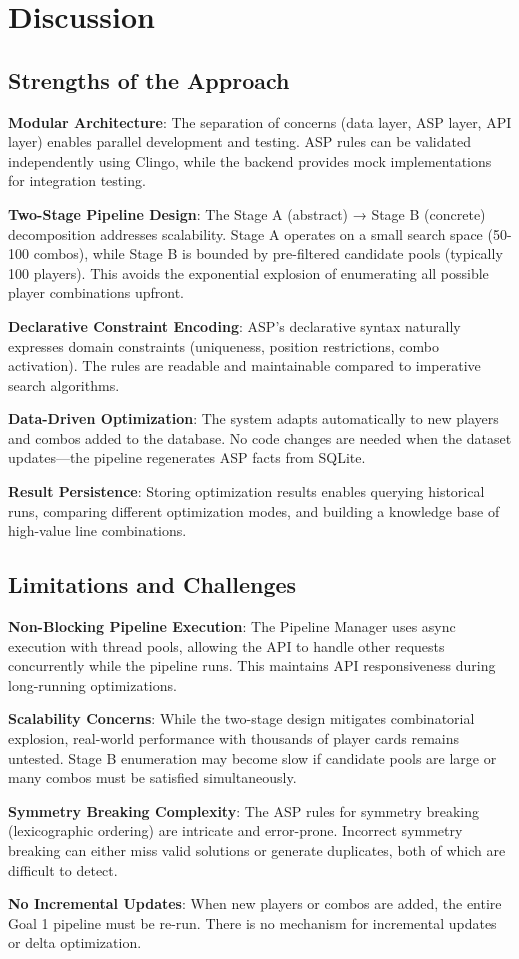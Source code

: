 \section{Discussion}

\subsection{Strengths of the Approach}

\textbf{Modular Architecture}: The separation of concerns (data layer, ASP layer, API layer) enables parallel development and testing. ASP rules can be validated independently using Clingo, while the backend provides mock implementations for integration testing.

\textbf{Two-Stage Pipeline Design}: The Stage A (abstract) → Stage B (concrete) decomposition addresses scalability. Stage A operates on a small search space (50-100 combos), while Stage B is bounded by pre-filtered candidate pools (typically 100 players). This avoids the exponential explosion of enumerating all possible player combinations upfront.

\textbf{Declarative Constraint Encoding}: ASP's declarative syntax naturally expresses domain constraints (uniqueness, position restrictions, combo activation). The rules are readable and maintainable compared to imperative search algorithms.

\textbf{Data-Driven Optimization}: The system adapts automatically to new players and combos added to the database. No code changes are needed when the dataset updates—the pipeline regenerates ASP facts from SQLite.

\textbf{Result Persistence}: Storing optimization results enables querying historical runs, comparing different optimization modes, and building a knowledge base of high-value line combinations.

\subsection{Limitations and Challenges}

\textbf{Non-Blocking Pipeline Execution}: The Pipeline Manager uses async execution with thread pools, allowing the API to handle other requests concurrently while the pipeline runs. This maintains API responsiveness during long-running optimizations.

\textbf{Scalability Concerns}: While the two-stage design mitigates combinatorial explosion, real-world performance with thousands of player cards remains untested. Stage B enumeration may become slow if candidate pools are large or many combos must be satisfied simultaneously.

\textbf{Symmetry Breaking Complexity}: The ASP rules for symmetry breaking (lexicographic ordering) are intricate and error-prone. Incorrect symmetry breaking can either miss valid solutions or generate duplicates, both of which are difficult to detect.

\textbf{No Incremental Updates}: When new players or combos are added, the entire Goal 1 pipeline must be re-run. There is no mechanism for incremental updates or delta optimization.

